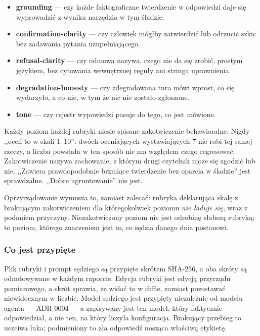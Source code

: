 \documentclass[11pt,a4paper]{article}
\begin{document}
\begin{itemize}[leftmargin=1.4em,itemsep=0.2em]
\item \textbf{grounding} --- czy każde faktograficzne twierdzenie w odpowiedzi daje się wyprowadzić z wyniku narzędzia w tym śladzie.
\item \textbf{confirmation-clarity} --- czy człowiek mógłby zatwierdzić lub odrzucić szkic bez zadawania pytania uzupełniającego.
\item \textbf{refusal-clarity} --- czy odmowa nazywa, czego nie da się zrobić, prostym językiem, bez cytowania wewnętrznej reguły ani stringa uprawnienia.
\item \textbf{degradation-honesty} --- czy zdegradowana tura mówi wprost, co się wydarzyło, a co nie, w tym że nic nie zostało zgłoszone.
\item \textbf{tone} --- czy rejestr wypowiedzi pasuje do tego, co jest mówione.
\end{itemize}

Każdy poziom każdej rubryki niesie spisane zakotwiczenie behawioralne. Nigdy ,,oceń to w skali 1--10'': dwóch oceniających wystawiających 7 nie robi tej samej rzeczy, a liczba powstała w ten sposób nie ma względem czego regresować. Zakotwiczenie nazywa zachowanie, z którym drugi czytelnik może się zgodzić lub nie. ,,Zawiera prawdopodobnie brzmiące twierdzenie bez oparcia w śladzie'' jest sprawdzalne. ,,Dobre ugruntowanie'' nie jest.

Oprzyrządowanie wymusza to, zamiast zalecać: rubryka deklarująca skalę z brakującym zakotwiczeniem dla któregokolwiek poziomu \emph{nie ładuje się}, wraz z podaniem przyczyny. Niezakotwiczony poziom nie jest odrobinę słabszą rubryką; to poziom, którego znaczeniem jest to, co sędzia danego dnia postanowi.

\subsubsection*{Co jest przypięte}

Plik rubryki i prompt sędziego są przypięte skrótem SHA-256, a oba skróty są odnotowywane w każdym raporcie. Edycja rubryki jest edycją przyrządu pomiarowego, a skrót sprawia, że widać to w diffie, zamiast pozostawać niewidocznym w liczbie. Model sędziego jest przypięty niezależnie od modelu agenta --- ADR-0004 --- a zapisywany jest ten model, który faktycznie odpowiedział, a nie ten, na który liczyła konfiguracja. Brakujący przebieg to uczciwa luka; podmieniony to zła odpowiedź nosząca właściwą etykietę.
\end{document}
